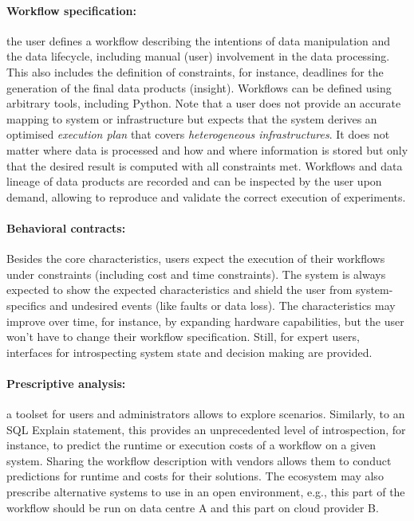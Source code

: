 \documentclass[a4paper, twocolumn]{article}
\begin{document}
\paragraph{Workflow specification:} the user defines a workflow describing the intentions of data manipulation and the data lifecycle, including manual (user) involvement in the data processing.
This also includes the definition of constraints, for instance, deadlines for the generation of the final data products (insight).
Workflows can be defined using arbitrary tools, including Python.
Note that a user does not provide an accurate mapping to system or infrastructure but expects that the system derives an optimised \textit{execution plan} that covers \textit{heterogeneous infrastructures}.
It does not matter where data is processed and how and where information is stored but only that the desired result is computed with all constraints met.
Workflows and data lineage of data products are recorded and can be inspected by the user upon demand, allowing to reproduce and validate the correct execution of experiments.


\paragraph{Behavioral contracts:}
Besides the core characteristics, users expect the execution of their workflows under constraints (including cost and time constraints).
The system is always expected to show the expected characteristics and shield the user from system-specifics and undesired events (like faults or data loss).
The characteristics may improve over time, for instance, by expanding hardware capabilities, but the user won't have to change their workflow specification.
Still, for expert users, interfaces for introspecting system state and decision making are provided.

\paragraph{Prescriptive analysis:} a toolset for users and administrators allows to explore scenarios.
Similarly, to an SQL Explain statement, this provides an unprecedented level of introspection, for instance, to predict the runtime or execution costs of a workflow on a given system.
Sharing the workflow description with vendors allows them to conduct predictions for runtime and costs for their solutions.
The ecosystem may also prescribe alternative systems to use in an open environment, e.g., this part of the workflow should be run on data centre A and this part on cloud provider B.
\end{document}
